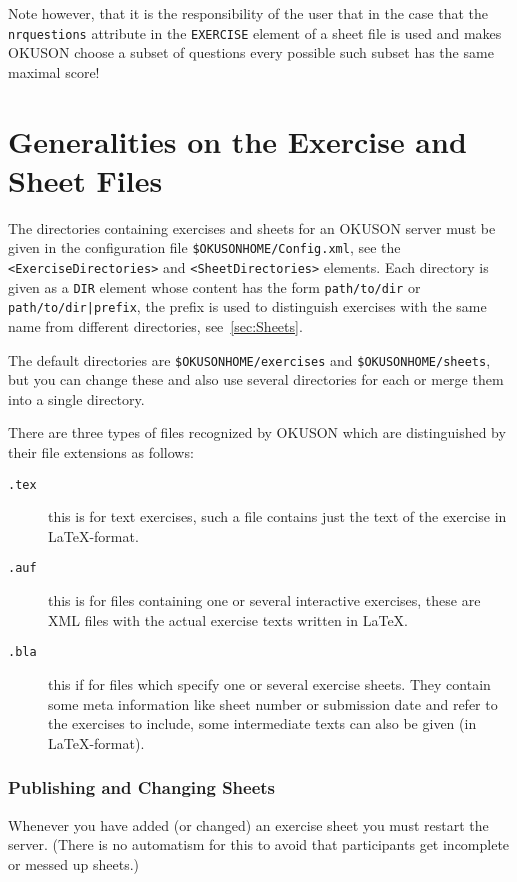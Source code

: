 \documentclass[12pt,openany,a4paper]{book}
\newcommand{\OKUSON}{\textsf{OKUSON}}
\begin{document}
Note however, that it is the responsibility of the user that in the case
that the \texttt{nrquestions} attribute in the \texttt{EXERCISE} element
of a sheet file is used and makes {\OKUSON} choose a subset of questions
every possible such subset has the same maximal score!


\section{Generalities on the Exercise and Sheet Files}

The directories containing exercises and sheets for an {\OKUSON} server must
be given  in the  configuration  file \texttt{\$OKUSONHOME/Config.xml},
see the \texttt{<ExerciseDirectories>} and \texttt{<SheetDirectories>}
elements. Each directory is given as a \texttt{DIR} element whose content
has the form \texttt{path/to/dir} or \texttt{path/to/dir|prefix}, the prefix
is used to distinguish exercises with the same name from different
directories, see~\ref{sec:Sheets}.

The default directories are \texttt{\$OKUSONHOME/exercises} and
\texttt{\$OKUSONHOME/sheets}, but you can change these and also use 
several directories for each or merge them into a single directory.

There are three types of files recognized by {\OKUSON} which are
distinguished by their file extensions as follows:
\begin{description}
\item[\texttt{.tex}] this is for text exercises, such a file
contains just the text of the exercise in \LaTeX-format.
\item[\texttt{.auf}] this is for files containing one or several interactive 
exercises, these are XML files with the actual exercise texts written in
\LaTeX.
\item[\texttt{.bla}] this if for files which specify one or several exercise
sheets. They contain some meta information like sheet number or submission
date and refer to the exercises to include, some intermediate texts can also
be given (in \LaTeX-format).
\end{description}

\subsubsection*{Publishing and Changing Sheets}\label{sssec:publishsheet}

Whenever you have added (or changed) an exercise sheet you must restart the
server. (There is no automatism for this to avoid that participants get
incomplete or messed up sheets.)
\end{document}
